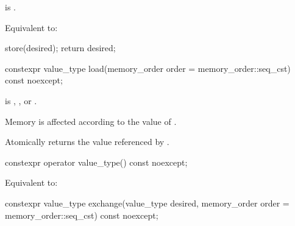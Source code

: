 \begin{itemdescr}
\pnum
\constraints
{} is .

\pnum
\effects
Equivalent to:
\begin{codeblock}
store(desired);
return desired;
\end{codeblock}
\end{itemdescr}

%
%
%
%
\begin{itemdecl}
constexpr value_type load(memory_order order = memory_order::seq_cst) const noexcept;
\end{itemdecl}

\begin{itemdescr}
\pnum
\expects
{} is
,
, or
.

\pnum
\effects
Memory is affected according to the value of .

\pnum
\returns
Atomically returns the value referenced by .
\end{itemdescr}

%
%
%
%
\begin{itemdecl}
constexpr operator value_type() const noexcept;
\end{itemdecl}

\begin{itemdescr}
\pnum
\effects
Equivalent to: 
\end{itemdescr}

%
%
%
%
\begin{itemdecl}
constexpr value_type exchange(value_type desired,
                              memory_order order = memory_order::seq_cst) const noexcept;
\end{itemdecl}


